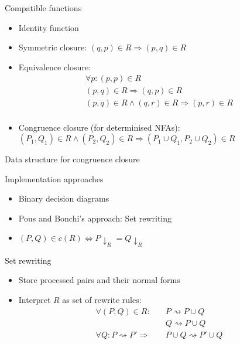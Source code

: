 \documentclass[compress]{beamer}
\begin{document}
\begin{frame}{Compatible functions}
  \begin{itemize}
    \item<1-> Identity function
    \item<2-> Symmetric closure: $(q, p) \in R \Rightarrow (p, q) \in R$
    \item<3-> Equivalence closure:
      \begin{align*}
        \forall p: (p, p) \in R\\
        (p, q) \in R \Rightarrow (q, p) \in R\\
        (p, q) \in R \land (q, r) \in R \Rightarrow (p, r) \in R\\
      \end{align*}
    \item<4-> Congruence closure (for determinised NFAs):\\
        $(P_1, Q_1) \in R \land (P_2, Q_2) \in R \Rightarrow (P_1 \cup Q_1, P_2 \cup Q_2) \in R$
  \end{itemize}
\end{frame}



\begin{frame}{Data structure for congruence closure}
  \begin{block}{Implementation approaches}
    \begin{itemize}
        \item Binary decision diagrams
        \item Pous and Bonchi's approach: Set rewriting
        \item $(P, Q) \in c(R) \iff P \downarrow_R = Q \downarrow_R$
    \end{itemize}
  \end{block}
  \begin{figure}
    
  \end{figure}
\end{frame}

\begin{frame}{Set rewriting}
  \begin{itemize}
    \item Store processed pairs and their normal forms
    \item Interpret $R$ as set of rewrite rules:
      \begin{align*}
        \forall (P, Q) \in R: \quad&P \rightsquigarrow P \cup Q\\
                              &Q \rightsquigarrow P \cup Q\\
        \forall Q: P \rightsquigarrow P' \Rightarrow & P \cup Q \rightsquigarrow P' \cup Q
      \end{align*}
  \end{itemize}
\end{frame}
\end{document}
